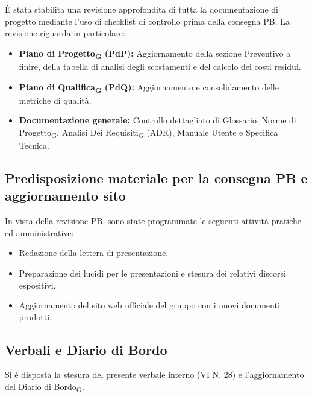 È stata stabilita una revisione approfondita di tutta la documentazione di progetto mediante l'uso di checklist di controllo prima della consegna PB. La revisione riguarda in particolare:
\begin{itemize}

\item \textbf{Piano di Progetto\textsubscript{G} (PdP):} Aggiornamento della sezione Preventivo a finire, della tabella di analisi degli scostamenti e del calcolo dei costi residui.

\item \textbf{Piano di Qualifica\textsubscript{G} (PdQ):} Aggiornamento e consolidamento delle metriche di qualità.

\item \textbf{Documentazione generale:} Controllo dettagliato di Glossario, Norme di Progetto\textsubscript{G}, Analisi Dei Requisiti\textsubscript{G} (ADR), Manuale Utente e Specifica Tecnica.

\end{itemize}


\subsection{Predisposizione materiale per la consegna PB e aggiornamento sito}

In vista della revisione PB, sono state programmate le seguenti attività pratiche ed amministrative:
\begin{itemize}

\item Redazione della lettera di presentazione.

\item Preparazione dei lucidi per le presentazioni e stesura dei relativi discorsi espositivi.

\item Aggiornamento del sito web ufficiale del gruppo con i nuovi documenti prodotti.

\end{itemize}


\subsection{Verbali e Diario di Bordo}

Si è disposta la stesura del presente verbale interno (VI N. 28) e l'aggiornamento del Diario di Bordo\textsubscript{G}.



